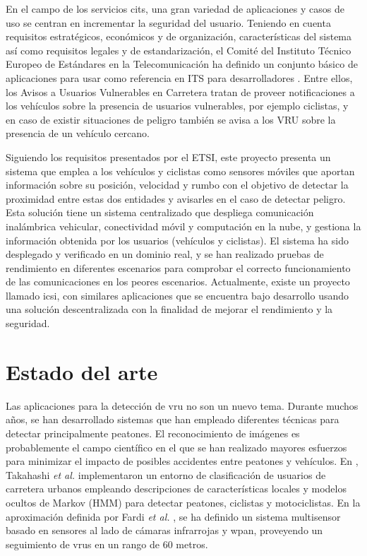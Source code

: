 En el campo de los servicios \gls{cits}, una gran variedad de aplicaciones y casos de uso se centran en incrementar la seguridad del usuario. Teniendo en cuenta requisitos estratégicos, económicos y de organización, características del sistema así como requisitos legales y de estandarización, el Comité del Instituto Técnico Europeo de Estándares en la Telecomunicación ha definido un conjunto básico de aplicaciones para usar como referencia en ITS para desarrolladores \cite{5}. Entre ellos, los Avisos a Usuarios Vulnerables en Carretera tratan de proveer notificaciones a los vehículos sobre la presencia de usuarios vulnerables, por ejemplo ciclistas, y en caso de existir situaciones de peligro también se avisa a los VRU sobre la presencia de un vehículo cercano.

Siguiendo los requisitos presentados por el ETSI, este proyecto presenta un sistema que emplea a los vehículos y ciclistas como sensores móviles que aportan información sobre su posición, velocidad y rumbo con el objetivo de detectar la proximidad entre estas dos entidades y avisarles en el caso de detectar peligro. Esta solución tiene un sistema centralizado que despliega comunicación inalámbrica vehicular, conectividad móvil y computación en la nube, y gestiona la información obtenida por los usuarios (vehículos y ciclistas). El sistema ha sido desplegado y verificado en un dominio real, y se han realizado pruebas de rendimiento en diferentes escenarios para comprobar el correcto funcionamiento de las comunicaciones en los peores escenarios. Actualmente, existe un proyecto llamado \gls{icsi}, con similares aplicaciones que se encuentra bajo desarrollo usando una solución descentralizada con la finalidad de mejorar el rendimiento y la seguridad.

\section{Estado del arte}\label{section:antecedentes}
Las aplicaciones para la detección de \gls{vru} no son un nuevo tema. Durante muchos años, se han desarrollado sistemas que han empleado diferentes técnicas para detectar principalmente peatones. El reconocimiento de imágenes es probablemente el campo científico en el que se han realizado mayores esfuerzos para minimizar el impacto de posibles accidentes entre peatones y vehículos. En \cite{6}, Takahashi \emph{et al.} implementaron un entorno de clasificación de usuarios de carretera urbanos empleando descripciones de características locales y modelos ocultos de Markov (HMM) para detectar peatones, ciclistas y motociclistas. En la aproximación definida por Fardi \emph{et al.} \cite{7}, se ha definido un sistema multisensor basado en sensores al lado de cámaras infrarrojas y \gls{wpan}, proveyendo un seguimiento de \gls{vru}s en un rango de 60 metros.


